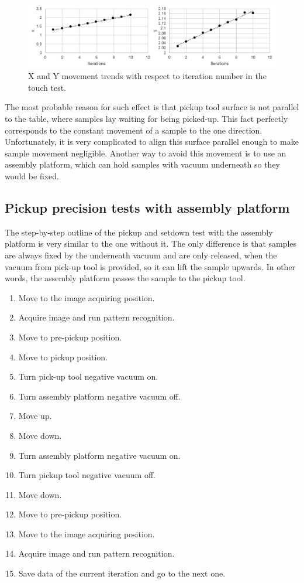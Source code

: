 \begin{figure}[ht]\centering
\includegraphics[width=1\linewidth]{Data/Precision_tests/XY_touch_movement.png}
\caption{X and Y movement trends with respect to iteration number in the touch test.}
\label{fig:touch_move}
\end{figure}

The most probable reason for such effect is that pickup tool surface is not parallel to the table, where samples lay waiting for being picked-up. This fact perfectly corresponds to the constant movement of a sample to the one direction. Unfortunately, it is very complicated to align this surface parallel enough to make sample movement negligible. Another way to avoid this movement is to use an assembly platform, which can hold samples with vacuum underneath so they would be fixed.

\subsection{Pickup precision tests with assembly platform}

The step-by-step outline of the pickup and setdown test with the assembly platform is very similar to the one without it. The only difference is that samples are always fixed by the underneath vacuum and are only released, when the vacuum from pick-up tool is provided, so it can lift the sample upwards. In other words, the assembly platform passes the sample to the pickup tool.

\begin{enumerate}
\setlength\itemsep{-0.5em}
\item Move to the image acquiring position.
\item Acquire image and run pattern recognition.
\item Move to pre-pickup position.
\item Move to pickup position.
\item Turn pick-up tool negative vacuum on.
\item Turn assembly platform negative vacuum off.
\item Move up.
\item Move down.
\item Turn assembly platform negative vacuum on.
\item Turn pickup tool negative vacuum off.
\item Move down.
\item Move to pre-pickup position.
\item Move to the image acquiring position.
\item Acquire image and run pattern recognition.
\item Save data of the current iteration and go to the next one.
\end{enumerate}

